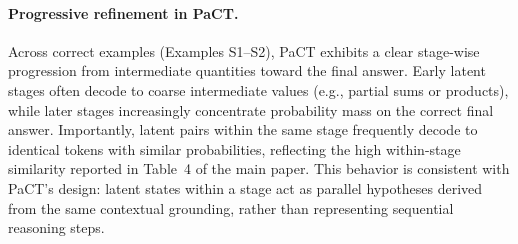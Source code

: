\paragraph{Progressive refinement in PaCT.}
Across correct examples (Examples S1--S2), PaCT exhibits a clear stage-wise progression from intermediate quantities toward the final answer. Early latent stages often decode to coarse intermediate values (e.g., partial sums or products), while later stages increasingly concentrate probability mass on the correct final answer. Importantly, latent pairs within the same stage frequently decode to identical tokens with similar probabilities, reflecting the high within-stage similarity reported in Table~4 of the main paper. This behavior is consistent with PaCT's design: latent states within a stage act as parallel hypotheses derived from the same contextual grounding, rather than representing sequential reasoning steps.

\vspace{0.8em}
\noindent{}

